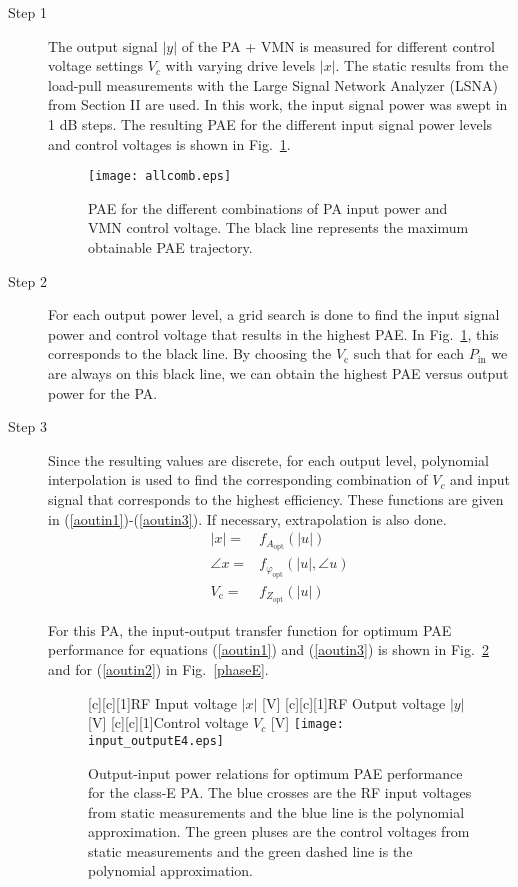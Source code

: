 \documentclass[10pt,journal]{IEEEtran}
\begin{document}
\begin{description}
\item[Step 1] The output signal $|y|$ of the PA + VMN is measured for different control voltage settings $V_c$ with varying drive levels $|x|$. The static results from the load-pull measurements with the Large Signal Network Analyzer (LSNA) from Section II are used. In this work, the input signal power was swept in 1 dB steps. The resulting PAE for the different input signal power levels and control voltages is shown in Fig.~\ref{allcomb}.

\begin{figure}
\centering
\texttt{[image: allcomb.eps]}
\caption{PAE for the different combinations of PA input power and VMN control voltage. The black line represents the maximum obtainable PAE trajectory.}
\label{allcomb}
\end{figure}

\item[Step 2] For each output power level, a grid search is done to find the input signal power and control voltage that results in the highest PAE. In Fig.~\ref{allcomb}, this corresponds to the black line. By choosing the $V_\text{c}$ such that for each $P_\text{in}$ we are always on this black line, we can obtain the highest PAE versus output power for the PA.

\item[Step 3] Since the resulting values are discrete, for each output level, polynomial interpolation is used to find the corresponding combination of $V_c$ and input signal that corresponds to the highest efficiency. These functions are given in (\ref{aoutin1})-(\ref{aoutin3}). If necessary, extrapolation is also done.
    \begin{eqnarray}
    |x| =& f_{A_{\text{opt}}}\left(|u|\right)\label{aoutin1}\\
    \angle{x} =&
    f_{\varphi_{\text{opt}}}\left(|u|,\angle{u}\right)\label{aoutin2}\\
    V_{\text{c}} =& f_{Z_{\text{opt}}}\left(|u|\right)\label{aoutin3}
    \end{eqnarray}

    For this PA, the input-output transfer function for optimum PAE performance for equations (\ref{aoutin1}) and (\ref{aoutin3}) is shown in Fig.~\ref{out-inE} and for (\ref{aoutin2}) in Fig.~\ref{phaseE}.

    \begin{figure}
    \centering
    [c][c][1]{RF Input voltage $|x|$ [V]} [c][c][1]{RF Output voltage $|y|$ [V]} [c][c][1]{Control voltage $V_c$ [V]}
    \texttt{[image: input\_outputE4.eps]}
    \caption{Output-input power relations for optimum PAE performance for the class-E PA. The blue crosses are the RF input voltages from static measurements and the blue line is the polynomial approximation. The green pluses are the control voltages from static measurements and the green dashed line is the polynomial approximation.}
    \label{out-inE}
    \end{figure}



\end{description}
\end{document}
